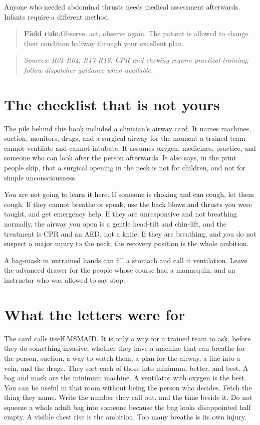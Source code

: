 \documentclass[10pt,openright]{book}
\newcommand{\fieldrule}[1]{\begin{quote}\textbf{Field rule.}\enspace #1\end{quote}}
\begin{document}
Anyone who needed abdominal thrusts needs medical assessment afterwards. Infants require a different method.

\fieldrule{Observe, act, observe again. The patient is allowed to change their condition halfway through your excellent plan.}
\begin{quote}\emph{Sources: R01-R04, R17-R19. CPR and choking require practical training; follow dispatcher guidance when available.}\end{quote}
\section*{The checklist that is not yours}
The pile behind this book included a clinician's airway card. It names machines, suction, monitors, drugs, and a surgical airway for the moment a trained team cannot ventilate and cannot intubate. It assumes oxygen, medicines, practice, and someone who can look after the person afterwards. It also says, in the print people skip, that a surgical opening in the neck is not for children, and not for simple unconsciousness.

You are not going to learn it here. If someone is choking and can cough, let them cough. If they cannot breathe or speak, use the back blows and thrusts you were taught, and get emergency help. If they are unresponsive and not breathing normally, the airway you open is a gentle head-tilt and chin-lift, and the treatment is CPR and an AED, not a knife. If they are breathing, and you do not suspect a major injury to the neck, the recovery position is the whole ambition.

A bag-mask in untrained hands can fill a stomach and call it ventilation. Leave the advanced drawer for the people whose course had a mannequin, and an instructor who was allowed to say stop.

\section*{What the letters were for}
The card calls itself MSMAID. It is only a way for a trained team to ask, before they do something invasive, whether they have a machine that can breathe for the person, suction, a way to watch them, a plan for the airway, a line into a vein, and the drugs. They sort each of those into minimum, better, and best. A bag and mask are the minimum machine. A ventilator with oxygen is the best. You can be useful in that room without being the person who decides. Fetch the thing they name. Write the number they call out, and the time beside it. Do not squeeze a whole adult bag into someone because the bag looks disappointed half empty. A visible chest rise is the ambition. Too many breaths is its own injury.
\end{document}
